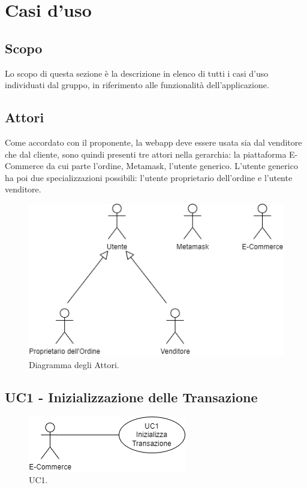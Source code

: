 \section{Casi d'uso} \label{section:casi_uso}

\subsection{Scopo}
Lo scopo di questa sezione è la descrizione in elenco di tutti i casi d'uso individuati dal gruppo, in
riferimento alle funzionalità dell'applicazione.

\subsection{Attori}
Come accordato con il proponente, la webapp deve essere usata sia dal venditore che dal cliente,
sono quindi presenti tre attori nella gerarchia: la piattaforma E-Commerce da cui parte l'ordine, Metamask\glo{}, l'utente generico.
L'utente generico ha poi due specializzazioni possibili: l'utente proprietario dell'ordine e l'utente venditore.

\begin{figure}[H]
    \centering
    \includegraphics[scale=0.7]{immagini/UseCases-Attori.png}
    \caption{Diagramma degli Attori.}
  \end{figure}

\subsection{UC1 - Inizializzazione delle Transazione}

\begin{figure}[H]
    \centering
    \includegraphics[scale=0.7]{immagini/UseCases-UC1.png}
    \caption{UC1.}
  \end{figure}


